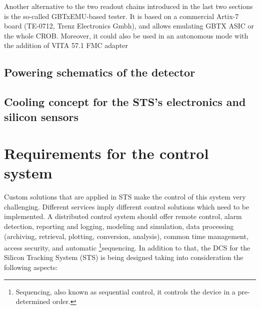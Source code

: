 \label{tester}
Another alternative to the two readout chains introduced in the last two sections is the so-called GBTxEMU-based tester. It is based on a commercial Artix-7 board (TE-0712, Trenz Electronics Gmbh), and allows emulating GBTX ASIC or the whole CROB. Moreover, it could also be used in an autonomous mode with the addition of VITA  57.1 FMC adapter
\subsection{Powering schematics of the detector}
\label{powering}
\subsection{Cooling concept for the STS's electronics and silicon sensors}
\label{cooling}


\section{Requirements for the control system}
\label{sys:req}
Custom solutions that are applied in \gls{STS} make the control of this system very challenging. Different services imply different control solutions which need to be implemented.
A distributed control system should offer remote control, alarm detection, reporting and logging, modeling and simulation, data processing (archiving, retrieval, plotting, conversion, analysis), common time management, access security, and automatic \footnote{Sequencing, also known as sequential control, it controls the device in a pre-determined order.}{sequencing}.
In addition to that, the \gls{DCS} for the Silicon Tracking System (\gls{STS}) is being designed taking into consideration the following aspects:

